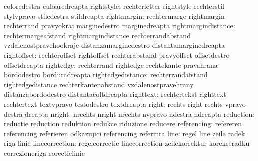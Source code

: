                            coloredestra              culoaredreapta
               rightstyle: rechterletter             rightstyle
                           rechterstil               stylvpravo
                           stiledestra               stildreapta
              rightmargin: rechtermarge              rightmargin
                           rechterrand               pravyokraj
                           marginedestro             marginedreapta
      rightmargindistance: rechtermargeafstand       rightmargindistance
                           rechterrandabstand        vzdalenostpravehookraje
                           distanzamarginedestro     distantamarginedreapta
              rightoffset: rechteroffset             rightoffset
                           rechterabstand            pravyoffset
                           offsetdestro              offsetdreapta
                rightedge: rechterrand               rightedge
                           rechtekante               pravahrana
                           bordodestro               borduradreapta
        rightedgedistance: rechterrandafstand        rightedgedistance
                           rechterkantenabstand      vzdalenostpravehrany
                           distanzabordodestro       distantacoltdreapta
                righttext: rechtertekst              righttext
                           rechtertext               textvpravo
                           testodestro               textdreapta %
                    right: rechts                    right
                           rechts                    vpravo
                           destra                    dreapta
                   nright: nrechts                   nright
                           nrechts                   nvpravo
                           ndestra                   ndreapta
                reduction: reductie                  reduction
                           reduktion                 redukce
                           riduzione                 reducere
              referencing: refereren                 referencing
                           referieren                odkazujici
                           referencing               referinta %
                     line: regel                     line
                           zeile                     radek
                           riga                      linie
           linecorrection: regelcorrectie            linecorrection
                           zeilekorrektur            korekceradku
                           correzioneriga            corectielinie
